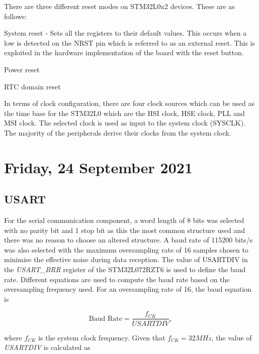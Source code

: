 There are three different reset modes on STM32L0x2 devices. These are as follows:

\begin{compactitem}
	\item System reset - Sets all the registers to their default values. This occurs when a low is detected on the NRST pin which is referred to as an external reset. This is exploited in the hardware implementation of the board with the reset button.
	\item Power reset
	\item RTC domain reset
\end{compactitem}

In terms of clock configuration, there are four clock sources which can be used as the time base for the STM32L0 which are the \ac{HSI} clock, \ac{HSE} clock, \ac{PLL} and \ac{MSI} clock. The selected clock is used as input to the system clock (SYSCLK). The majority of the peripherals derive their clocks from the system clock.

\pendsign	
	
\section[2021/09/24]{Friday, 24 September 2021}

\subsection{\ac{USART}}

For the serial communication component, a word length of 8 bits was selected with no parity bit and 1 stop bit as this the most common structure used and there was no reason to choose an altered structure. A baud rate of 115200 bits/s was also selected with the maximum oversampling rate of 16 samples chosen to minimise the effective noise during data reception. The value of USARTDIV in the \textit{USART\_BRR} register of the STM32L072RZT6 is used to define the baud rate. Different equations are used to compute the baud rate based on the oversampling frequency used. For an oversampling rate of 16, the baud equation is

\begin{equation}
	\text{Baud Rate}=\frac{f_{CK}}{\textit{USARTDIV}},
\end{equation}

where $f_{CK}$ is the system clock frequency. Given that $f_{CK}=32MHz$, the value of \textit{USARTDIV} is calculated as 

